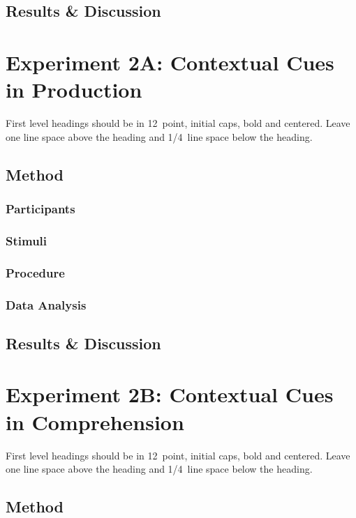 \documentclass[10pt,letterpaper]{article}
\begin{document}
\subsection{Results \& Discussion}


\section{Experiment 2A: Contextual Cues in Production}

First level headings should be in 12~point, initial caps, bold and
centered. Leave one line space above the heading and 1/4~line space
below the heading.

\subsection{Method}

\subsubsection{Participants}

\subsubsection{Stimuli}

\subsubsection{Procedure}

\subsubsection{Data Analysis}

\subsection{Results \& Discussion}

\section{Experiment 2B: Contextual Cues in Comprehension}

First level headings should be in 12~point, initial caps, bold and
centered. Leave one line space above the heading and 1/4~line space
below the heading.

\subsection{Method}
\end{document}
